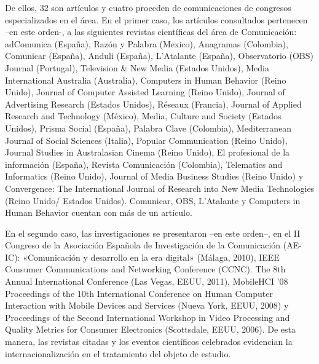 \documentclass[spanish]{textolivre}
\begin{document}
De ellos, 32 son artículos y cuatro proceden de comunicaciones de congresos especializados en el área. En el primer caso, los artículos consultados pertenecen –en este orden-, a las siguientes revistas científicas del área de Comunicación: adComunica (España), Razón y Palabra (Mexico), Anagramas (Colombia), Comunicar (España), Anduli (España), L’Atalante (España), Observatorio (OBS) Journal (Portugal), Television \& New Media (Estados Unidos), Media International Australia (Australia), Computers in Human Behavior (Reino Unido), Journal of Computer Assisted Learning (Reino Unido), Journal of Advertising Research (Estados Unidos), Réseaux (Francia), Journal of Applied Research and Technology (México), Media, Culture and Society (Estados Unidos), Prisma Social (España), Palabra Clave (Colombia), Mediterranean Journal of Social Sciences (Italia), Popular Communication (Reino Unido), Journal Studies in Australasian Cinema (Reino Unido), El profesional de la información (España), Revista Comunicación (Colombia), Telematics and Informatics (Reino Unido), Journal of Media Business Studies (Reino Unido) y Convergence: The International Journal of Research into New Media Technologies (Reino Unido/ Estados Unidos). Comunicar, OBS, L’Atalante y Computers in Human Behavior cuentan con más de un artículo. 

En el segundo caso, las investigaciones se presentaron –en este orden–, en el II Congreso de la Asociación Española de Investigación de la Comunicación (AE-IC): «Comunicación y desarrollo en la era digital» (Málaga, 2010), IEEE Consumer Communications and Networking Conference (CCNC). The 8th Annual International Conference (Las Vegas, EEUU, 2011), MobileHCI '08 Proceedings of the 10th International Conference on Human Computer Interaction with Mobile Devices and Services (Nueva York, EEUU, 2008) y Proceedings of the Second International Workshop in Video Processing and Quality Metrics for Consumer Electronics (Scottsdale, EEUU, 2006). De esta manera, las revistas citadas y los eventos científicos celebrados evidencian la internacionalización en el tratamiento del objeto de estudio. 
\end{document}
